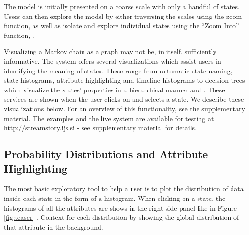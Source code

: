 The model is initially presented on a coarse scale with only a handful
of states. Users can then explore the model by either traversing the scales using the zoom 
function, as well as isolate and explore individual states using the ``Zoom Into'' function, .

Visualizing a Markov chain as a graph may not be, in itself,  sufficiently informative. The system offers several 
visualizations which assist users in identifying the meaning of states. These range from automatic
state naming, state histograms, attribute highlighting and timeline histograms to decision trees
which visualize the states' properties in a hierarchical manner and .
These services are shown when the user clicks on and selects a state. We describe these visualizations below.  For an overview of this functionality, see the supplementary material. The examples and the live system are available for testing at \url{http://streamstory.ijs.si} - see supplementary material for details. 




\subsection{Probability Distributions and Attribute Highlighting}

The most basic exploratory tool to help a user is to plot the distribution of data inside each state in the form of a histogram. When clicking on a state, the histograms of all the attributes are shows in the right-side panel like in
Figure \ref{fig:teaser} . Context for each distribution by showing the global distribution of that attribute in the background.

